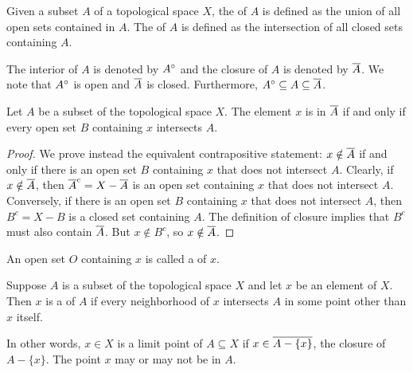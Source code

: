 \begin{definition}
Given a subset $A$ of a topological space $X$, the  of $A$ is defined as the union of all open sets contained in $A$.
The  of $A$ is defined as the intersection of all closed sets containing $A$.
\end{definition}

The interior of $A$ is denoted by ${A}^{\circ}$ and the closure of $A$ is denoted by $\overline{A}$.
We note that ${A}^{\circ}$ is open and $\overline{A}$ is closed.
Furthermore, ${A}^{\circ} \subseteq A \subseteq \overline{A}$.

\begin{theorem} \label{theorem:ClosureConditions}
Let $A$ be a subset of the topological space $X$.
The element $x$ is in $\overline{A}$ if and only if every open set $B$ containing $x$ intersects $A$.
\end{theorem}
\begin{proof}
We prove instead the equivalent contrapositive statement: $x \notin \overline{A}$ if and only if there is an open set $B$ containing $x$ that does not intersect $A$.
Clearly, if  $x \notin \overline{A}$, then $\overline{A}^c = X - \overline{A}$ is an open set containing $x$ that does not intersect $A$.
Conversely, if there is an open set $B$ containing $x$ that does not intersect $A$, then $B^c = X-B$ is a closed set containing $A$.
The definition of closure implies that $B^c$ must also contain $\overline{A}$.
But $x \notin B^c$, so $x\notin \overline{A}$.
\end{proof}

\begin{definition}
An open set $O$ containing $x$ is called a  of $x$.
\end{definition}

\begin{definition}
Suppose $A$ is a subset of the topological space $X$ and let $x$ be an element of $X$.
Then $x$ is a  of $A$ if every neighborhood of $x$ intersects $A$ in some point other than $x$ itself.
\end{definition}

In other words, $x \in X$ is a limit point of $A \subseteq X$ if $x \in \overline{A - \{ x \}}$, the closure of $A - \{ x \}$.
The point $x$ may or may not be in $A$.

